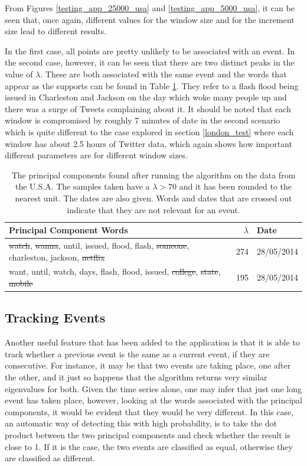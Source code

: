 \documentclass[11pt,a4paper]{article}
\begin{document}
From Figures \ref{testing_app_25000_usa} and \ref{testing_app_5000_usa}, it can be seen that, once again, different values for the window size and for the increment size lead to different results. 

In the first case, all points are pretty unlikely to be associated with an event. In the second case, however, it can be seen that there are two distinct peaks in the value of $\lambda$. These are both associated with the same event and the words that appear as the supports can be found in Table \ref{streaming_test_us}. They refer to a flash flood being issued in Charleston and Jackson on the day which woke many people up and there was a surge of Tweets complaining about it. It should be noted that each window is compromised by roughly 7 minutes of date in the second scenario which is quite different to the case explored in section \ref{london_test} where each window has about 2.5 hours of Twitter data, which again shows how important different parameters are for different window sizes. 
\begin{table}[H]
\center
\begin{tabular}{| p{11cm}| r | l|}
\hline
Principal Component Words & $\lambda$ & Date\\
\hline
\st{watch}, \st{wanna}, until, issued, flood, flash, \st{someone}, charleston, jackson, \st{netflix} & 274 & 28/05/2014	 \\
want, until, watch, days, flash, flood, issued, \st{college}, \st{state}, \st{mobile}& 195 & 28/05/2014	 \\
\hline
\end{tabular}
\caption{The principal components found after running the algorithm on the data from the U.S.A. The samples taken have a $\lambda > 70$ and it has been rounded to the nearest unit. The dates are also given. Words and dates that are crossed out indicate that they are not relevant for an event.}
\label{streaming_test_us}
\end{table}

\subsection{Tracking Events}
Another useful feature that has been added to the application is that it is able to track whether a previous event is the same as a current event, if they are consecutive. For instance, it may be that two events are taking place, one after the other, and it just so happens that the algorithm returns very similar eigenvalues for both. Given the time series alone, one may infer that just one long event has taken place, however, looking at the words associated with the principal components, it would be evident that they would be very different. In this case, an automatic way of detecting this with high probability, is to take the dot product between the two principal components and check whether the result is close to 1. If it is the case, the two events are classified as equal, otherwise they are classified as different. 
\end{document}
